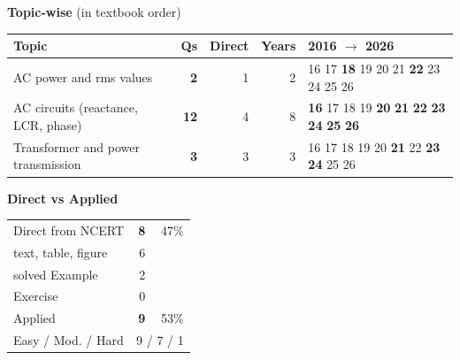 {\small\textbf{\color{crimson}Topic-wise} (in textbook order)\par\smallskip
\begin{tabularx}{\linewidth}{@{}>{\raggedright\arraybackslash}Xrrrl@{}}\toprule
Topic & Qs & Direct & Years & 2016 $\rightarrow$ 2026\\\midrule
AC power and rms values & \textbf{2} & 1 & 2 & {\scriptsize {\color{gray!45}16} {\color{gray!45}17} \textbf{18} {\color{gray!45}19} {\color{gray!45}20} {\color{gray!45}21} \textbf{22} {\color{gray!45}23} {\color{gray!45}24} {\color{gray!45}25} {\color{gray!45}26}}\\
AC circuits (reactance, LCR, phase) & \textbf{12} & 4 & 8 & {\scriptsize \textbf{16} {\color{gray!45}17} {\color{gray!45}18} {\color{gray!45}19} \textbf{20} \textbf{21} \textbf{22} \textbf{23} \textbf{24} \textbf{25} \textbf{26}}\\
Transformer and power transmission & \textbf{3} & 3 & 3 & {\scriptsize {\color{gray!45}16} {\color{gray!45}17} {\color{gray!45}18} {\color{gray!45}19} {\color{gray!45}20} \textbf{21} {\color{gray!45}22} \textbf{23} \textbf{24} {\color{gray!45}25} {\color{gray!45}26}}\\
\bottomrule\end{tabularx}}\par\medskip
\begin{minipage}[t]{0.34\linewidth}{\small\textbf{\color{crimson}Direct vs Applied}\par\smallskip
\begin{tabular}{@{}lrr@{}}\toprule
Direct from NCERT & \textbf{8} & 47\%\\
\quad text, table, figure & 6 &\\
\quad solved Example & 2 &\\
\quad Exercise & 0 &\\
Applied & \textbf{9} & 53\%\\\midrule
Easy / Mod. / Hard & \multicolumn{2}{r}{9 / 7 / 1}\\\bottomrule
\end{tabular}}\end{minipage}\hfill
